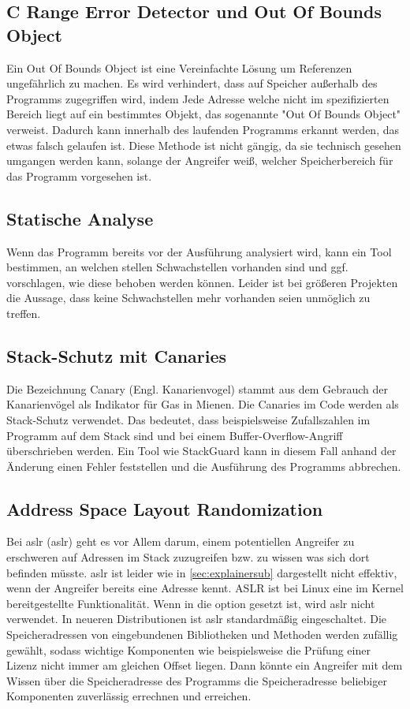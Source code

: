 \subsection{C Range Error Detector und Out Of Bounds Object}
Ein Out Of Bounds Object ist eine Vereinfachte Lösung um Referenzen ungefährlich zu machen.
Es wird verhindert, dass auf Speicher außerhalb des Programms zugegriffen wird, indem Jede
Adresse welche nicht im spezifizierten Bereich liegt auf ein bestimmtes Objekt, das sogenannte
"Out Of Bounds Object" verweist. Dadurch kann innerhalb des laufenden Programms erkannt werden, das
etwas falsch gelaufen ist. Diese Methode ist nicht gängig, da sie technisch gesehen
umgangen werden kann, solange der Angreifer weiß, welcher Speicherbereich für das Programm
vorgesehen ist.

\subsection{Statische Analyse}
Wenn das Programm bereits vor der Ausführung analysiert wird, kann ein
Tool bestimmen, an welchen stellen Schwachstellen vorhanden sind und
ggf. vorschlagen, wie diese behoben werden können. Leider ist bei größeren
Projekten die Aussage, dass keine Schwachstellen mehr vorhanden seien
unmöglich zu treffen.

\subsection{Stack-Schutz mit Canaries} \label{sec:canaries}
Die Bezeichnung Canary (Engl. Kanarienvogel) stammt aus dem Gebrauch der Kanarienvögel als
Indikator für Gas in Mienen. Die Canaries im Code werden als Stack-Schutz verwendet. Das bedeutet,
dass beispielsweise Zufallszahlen im Programm auf dem Stack sind und bei einem Buffer-Overflow-Angriff
überschrieben werden. Ein Tool wie StackGuard kann in diesem Fall anhand der Änderung einen Fehler feststellen und
die Ausführung des Programms abbrechen.

\subsection{Address Space Layout Randomization} \label{sec:aslr}
Bei \acrlong*{aslr} (\acrshort*{aslr}) geht es vor Allem darum, einem potentiellen Angreifer zu erschweren
auf Adressen im Stack zuzugreifen bzw. zu wissen was sich dort befinden müsste.
\gls*{aslr} ist leider wie in \autoref{sec:explainersub} dargestellt nicht effektiv, wenn der Angreifer
bereits eine Adresse kennt.
ASLR ist bei Linux eine im Kernel bereitgestellte Funktionalität.
Wenn in  die option  gesetzt ist,
wird \gls*{aslr}  nicht verwendet. \cite{aslrandrew} In neueren Distributionen ist \gls*{aslr} 
standardmäßig eingeschaltet.
Die Speicheradressen von eingebundenen Bibliotheken und Methoden werden
zufällig gewählt, sodass wichtige Komponenten wie beispielsweise die
Prüfung einer Lizenz nicht immer am gleichen Offset liegen. Dann könnte ein Angreifer
mit dem Wissen über die Speicheradresse des Programms die Speicheradresse beliebiger
Komponenten zuverlässig errechnen und erreichen.

